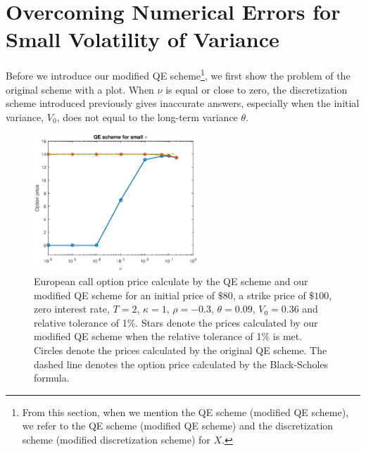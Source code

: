 \documentclass{ws-ijfe}
\begin{document}
\section{Overcoming Numerical Errors for Small Volatility of Variance}


Before we introduce our modified QE scheme\footnote{From this section, when we mention the QE scheme (modified QE scheme), we refer to the QE scheme (modified QE scheme) and the discretization scheme (modified discretization scheme) for $X$.}, we first show the problem of the original scheme with a plot.
When $\nu$ is equal or close to zero, the discretization scheme introduced previously gives inaccurate answers, especially when the initial variance, $V_0$, does not equal to the long-term variance $\theta$.

\begin{figure}[h]
\centering
\includegraphics[width=0.55\textwidth]{FigureIn2_3_1.eps}
\caption{European call option price calculate by the QE scheme and our modified QE scheme for an initial price of $\$80$, a strike price of $\$100$, zero interest rate, $T=2$, $\kappa=1$, $\rho=-0.3$, $\theta=0.09$, $V_0=0.36$ and relative tolerance of 1\%. Stars denote the prices calculated by our modified QE scheme when the relative tolerance of 1\% is met. Circles denote the prices calculated by the original QE scheme. The dashed line denotes the option price calculated by the Black-Scholes formula.}
\end{figure}
\end{document}
